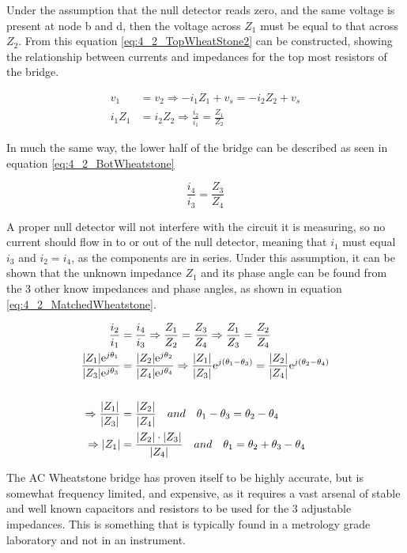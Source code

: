 Under the assumption that the null detector reads zero, and the same voltage is present at node b and d, then the voltage
across $Z_1$ must be equal to that across $Z_2$. From this equation \ref{eq:4_2_TopWheatStone2} can be constructed, showing the
relationship between currents and impedances for the top most resistors of the bridge.

\begin{equation}
    \begin{split}
        \label{eq:4_2_TopWheatStone2}
        v_1 &= v_2 \Rightarrow -i_1 Z_1 +v_s = -i_2 Z_2 + v_s \\
        i_1 Z_1 &= i_2 Z_2 \Rightarrow \frac{i_2}{i_1} = \frac{Z_1}{Z_2}
    \end{split}
\end{equation}

In much the same way, the lower half of the bridge can be described as seen in equation \ref{eq:4_2_BotWheatstone}

\begin{equation}
    \label{eq:4_2_BotWheatstone}
    \frac{i_4}{i_3} = \frac{Z_3}{Z_4}
\end{equation}

A proper null detector will not interfere with the circuit it is measuring, so no current should flow in to or out of the
null detector, meaning that $i_1$ must equal $i_3$ and $i_2 = i_4$, as the components are in series. Under this assumption, it can be
shown that the unknown impedance $Z_1$ and its phase angle can be found from the 3 other know impedances and phase angles, as shown
in equation \ref{eq:4_2_MatchedWheatstone}.

\begin{equation}
    \begin{split}
        \label{eq:4_2_MatchedWheatstone}
        \frac{i_2}{i_1} &= \frac{i_4}{i_3} \Rightarrow \frac{Z_1}{Z_2} = \frac{Z_3}{Z_4} \Rightarrow \frac{Z_1}{Z_3} = \frac{Z_2}{Z_4} \\
        \frac{|Z_1|\mathrm{e}^{j\theta_1}}{|Z_3|\mathrm{e}^{j\theta_3}} &= \frac{|Z_2|\mathrm{e}^{j\theta_2}}{|Z_4|\mathrm{e}^{j\theta_4}}
        \Rightarrow \frac{|Z_1|}{|Z_3|}\mathrm{e}^{j\left(\theta_1-\theta_3\right)} = \frac{|Z_2|}{|Z_4|}\mathrm{e}^{j\left(\theta_2-\theta_4\right)} \\
        \\
        \Rightarrow \frac{|Z_1|}{|Z_3|} &= \frac{|Z_2|}{|Z_4|} \quad and \quad \theta_1-\theta_3 = \theta_2-\theta_4 \\
        \Rightarrow |Z_1| &= \frac{|Z_2|\cdot|Z_3|}{|Z_4|} \quad and \quad \theta_1 = \theta_2+\theta_3-\theta_4
    \end{split}
\end{equation}

The AC Wheatstone bridge has proven itself to be highly accurate, but is somewhat frequency limited, and expensive, as it requires a
vast arsenal of stable and well known capacitors and resistors to be used for the 3 adjustable impedances. This is something that
is typically found in a metrology grade laboratory and not in an instrument.

